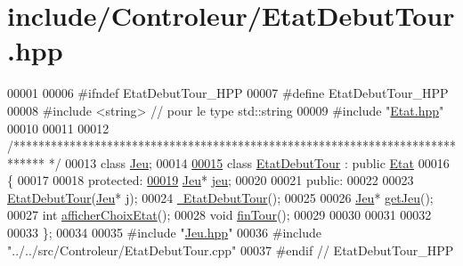 \hypertarget{_etat_debut_tour_8hpp_source}{\section{include/\-Controleur/\-Etat\-Debut\-Tour.hpp}
}

\begin{DoxyCode}
00001 
00006 \textcolor{preprocessor}{#ifndef EtatDebutTour\_HPP}
00007 \textcolor{preprocessor}{}\textcolor{preprocessor}{#define EtatDebutTour\_HPP}
00008 \textcolor{preprocessor}{}\textcolor{preprocessor}{#include <string>} \textcolor{comment}{// pour le type std::string}
00009 \textcolor{preprocessor}{#include "\hyperlink{_etat_8hpp}{Etat.hpp}"}
00010 
00011 
00012 \textcolor{comment}{/*****************************************************************************
      */}
00013 \textcolor{keyword}{class }\hyperlink{class_jeu}{Jeu};
00014 
\hypertarget{_etat_debut_tour_8hpp_source_l00015}{}\hyperlink{class_etat_debut_tour}{00015} \textcolor{keyword}{class }\hyperlink{class_etat_debut_tour}{EtatDebutTour} : \textcolor{keyword}{public} \hyperlink{class_etat}{Etat}
00016 \{
00017 
00018     \textcolor{keyword}{protected}:
\hypertarget{_etat_debut_tour_8hpp_source_l00019}{}\hyperlink{class_etat_debut_tour_a0a54a446667e7868dc4a88efff67055d}{00019}         \hyperlink{class_jeu}{Jeu}* \hyperlink{class_etat_debut_tour_a0a54a446667e7868dc4a88efff67055d}{jeu};   
00020 
00021     \textcolor{keyword}{public}:
00022         
00023         \hyperlink{class_etat_debut_tour_aa5b6ac2f696939c38ef726489c518975}{EtatDebutTour}(\hyperlink{class_jeu}{Jeu}* j);
00024         \hyperlink{class_etat_debut_tour_a615b6f4808730d92f52d9d1aa93a706d}{~EtatDebutTour}();
00025 
00026         \hyperlink{class_jeu}{Jeu}* \hyperlink{class_etat_debut_tour_a764bfcd224a4f306682d352a74f4cea8}{getJeu}();
00027         \textcolor{keywordtype}{int} \hyperlink{class_etat_debut_tour_a603db223f7f5f4c76fd6b978b54f33ae}{afficherChoixEtat}();
00028         \textcolor{keywordtype}{void} \hyperlink{class_etat_debut_tour_a0929f3701b5a1cda1e86aed3d2b40542}{finTour}();
00029         
00030         
00031         
00032         
00033 \};
00034 
00035 \textcolor{preprocessor}{#include "\hyperlink{_jeu_8hpp}{Jeu.hpp}"}
00036 \textcolor{preprocessor}{#include "../../src/Controleur/EtatDebutTour.cpp"}
00037 \textcolor{preprocessor}{#endif // EtatDebutTour\_HPP     }
\end{DoxyCode}
